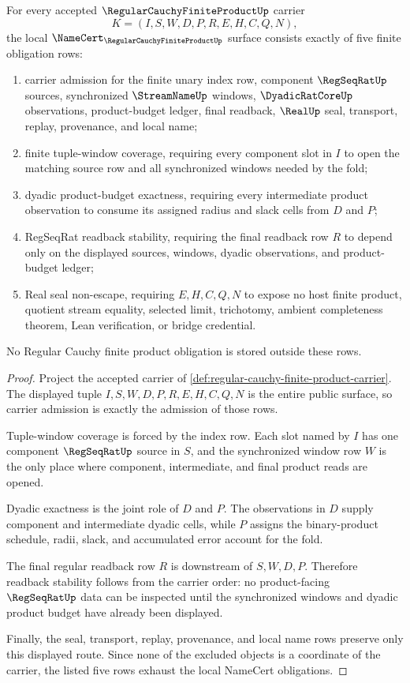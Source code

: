 \begin{theorem}\label{thm:regular-cauchy-finite-product-namecert-obligations}
For every accepted $\RegularCauchyFiniteProductUp$ carrier
$$
K=(I,S,W,D,P,R,E,H,C,Q,N),
$$
the local $\NameCert_{\RegularCauchyFiniteProductUp}$ surface consists exactly of five finite obligation rows:
\begin{enumerate}
\item carrier admission for the finite unary index row, component $\RegSeqRatUp$ sources, synchronized $\StreamNameUp$ windows, $\DyadicRatCoreUp$ observations, product-budget ledger, final readback, $\RealUp$ seal, transport, replay, provenance, and local name;
\item finite tuple-window coverage, requiring every component slot in $I$ to open the matching source row and all synchronized windows needed by the fold;
\item dyadic product-budget exactness, requiring every intermediate product observation to consume its assigned radius and slack cells from $D$ and $P$;
\item RegSeqRat readback stability, requiring the final readback row $R$ to depend only on the displayed sources, windows, dyadic observations, and product-budget ledger;
\item Real seal non-escape, requiring $E,H,C,Q,N$ to expose no host finite product, quotient stream equality, selected limit, trichotomy, ambient completeness theorem, Lean verification, or bridge credential.
\end{enumerate}
No Regular Cauchy finite product obligation is stored outside these rows.
\end{theorem}
\begin{proof}
Project the accepted carrier of \autoref{def:regular-cauchy-finite-product-carrier}. The displayed tuple $I,S,W,D,P,R,E,H,C,Q,N$ is the entire public surface, so carrier admission is exactly the admission of those rows.

Tuple-window coverage is forced by the index row. Each slot named by $I$ has one component $\RegSeqRatUp$ source in $S$, and the synchronized window row $W$ is the only place where component, intermediate, and final product reads are opened.

Dyadic exactness is the joint role of $D$ and $P$. The observations in $D$ supply component and intermediate dyadic cells, while $P$ assigns the binary-product schedule, radii, slack, and accumulated error account for the fold.

The final regular readback row $R$ is downstream of $S,W,D,P$. Therefore readback stability follows from the carrier order: no product-facing $\RegSeqRatUp$ data can be inspected until the synchronized windows and dyadic product budget have already been displayed.

Finally, the seal, transport, replay, provenance, and local name rows preserve only this displayed route. Since none of the excluded objects is a coordinate of the carrier, the listed five rows exhaust the local NameCert obligations.
\end{proof}

